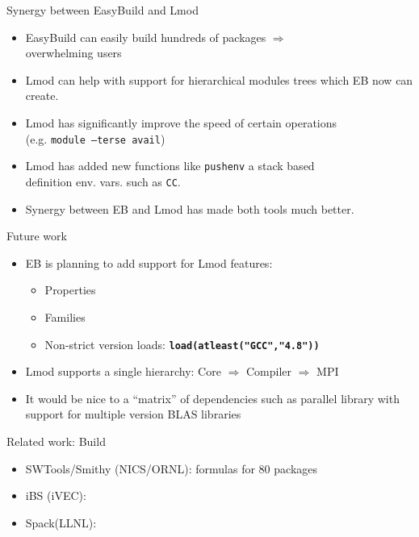 \documentclass[10pt,xcolor={usenames,dvipsnames}]{beamer}
\begin{document}
\begin{frame}{Synergy between EasyBuild and Lmod}
\begin{itemize}
  \item
    EasyBuild can easily build hundreds of packages $\Rightarrow$ \\
    overwhelming users
  \item
    Lmod can help with support for hierarchical modules trees which EB
    now can create.
  \item
    Lmod has significantly improve the speed of certain operations \\
    (e.g. \texttt{module --terse avail})
  \item
    Lmod has added new functions like \texttt{pushenv} a stack based \\
    definition env. vars. such as \texttt{CC}.
  \item
    Synergy between EB and Lmod has made both tools much better.
\end{itemize}
\end{frame}


\begin{frame}{Future work}
\begin{itemize}
    \item EB is planning to add support for Lmod features:
      \begin{itemize}
        \item Properties
        \item Families
        \item Non-strict version loads: \texttt{\bf load(atleast("GCC","4.8"))}
      \end{itemize}
    \item Lmod supports a single hierarchy: Core $\Rightarrow$
      Compiler $\Rightarrow$ MPI
    \item It would be nice to a ``matrix'' of dependencies such as
      parallel library with support for multiple version BLAS libraries
\end{itemize}
\end{frame}


\begin{frame}{Related work: Build}
\begin{itemize}
    \item SWTools/Smithy (NICS/ORNL): formulas for 80 packages
    \item iBS (iVEC):
    \item Spack(LLNL): 
\end{itemize}
\end{frame}
\end{document}
